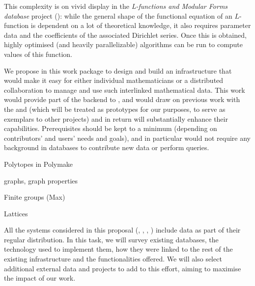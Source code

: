 \begin{workpackage}[id=dksbases,wphases=1-48!.5,
  title=Data/Knowledge/Software-Bases,lead=JU,
  ZHRM=12,JURM=36,USHRM=12,UWRM=25,SARM=10,LLRM=2,PSRM=4]
\begin{wpdescription}
  This complexity is on vivid display in the \emph{L-functions and Modular Forms database}
  project (\LMFDB): while the general shape of the functional equation of an $L$-function
  is dependent on a lot of theoretical knowledge, it also requires parameter data and the
  coefficients of the associated Dirichlet series. Once this is obtained, highly optimised
  (and heavily parallelizable) algorithms can be run to compute values of this function.

  We propose in this work package to design and build an infrastructure that would make it
  easy for either individual mathematicians or a distributed collaboration to manage and
  use such interlinked mathematical data. This work would provide part of the backend to
  , and would draw on previous work
  with the \LMFDB and \FindStat (which will be treated as prototypes for our purposes, to
  serve as exemplars to other projects) and in return will substantially enhance their
  capabilities. Prerequisites should be kept to a minimum (depending on contributors' and
  users' needs and goals), and in particular would not require any background in databases
  to contribute new data or perform queries.
  
      \begin{compactitem}
     \item Polytopes in Polymake
     \item graphs, graph properties
     \item Finite groups (Max)
     \item Lattices
     \end{compactitem}
\end{wpdescription}

\begin{tasklist}
\begin{task}[title=Survey of existing databases,id=data-assessment,
  lead=ZH,partners={JU,SA,UW,US}]
  All the systems considered in this proposal (\GAP, \Sage, \Pari, \Singular) include data
  as part of their regular distribution. In this task, we will survey existing databases,
  the technology used to implement them, how they were linked to the rest of the existing
  infrastructure and the functionalities offered. We will also select additional external
  data and projects to add to this effort, aiming to maximise the impact of our work.
\end{task}

\begin{task}[id=data-design,lead=JU,partners={ZH,US,SA,UW,LL},
  title={Formulation of requirements and design of new  infrastructure when appropriate}]


\end{task}
\end{tasklist}
\end{workpackage}
